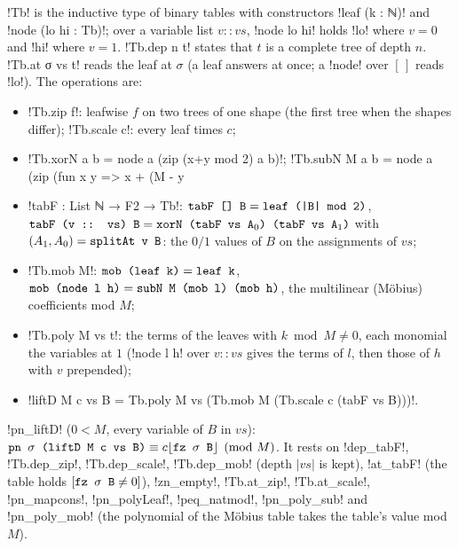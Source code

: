 \begin{definition}\label{def:lean-pathsum-liftd}
\lean!Tb! is the inductive type of binary tables with constructors \lean!leaf (k : ℕ)! and
\lean!node (lo hi : Tb)!; over a variable list $v::vs$, \lean!node lo hi! holds \lean!lo! where
$v=0$ and \lean!hi! where $v=1$. \lean!Tb.dep n t! states that $t$ is a complete tree of depth $n$.
\lean!Tb.at σ vs t! reads the leaf at $\sigma$ (a leaf answers at once; a \lean!node! over $[\,]$
reads \lean!lo!). The operations are:
\begin{itemize}
\item \lean!Tb.zip f!: leafwise $f$ on two trees of one shape (the first tree when the shapes
  differ); \lean!Tb.scale c!: every leaf times $c$;
\item \lean!Tb.xorN a b = node a (zip (x+y mod 2) a b)!; \lean!Tb.subN M a b = node a (zip (fun x y => x + (M - y %
\item \lean!tabF : List ℕ → F2 → Tb!: $\textnormal{\texttt{tabF [] B}}=\textnormal{\texttt{leaf (|B| mod 2)}}$,
  $\textnormal{\texttt{tabF (v :: vs) B}} = \textnormal{\texttt{xorN (tabF vs A}}_0\textnormal{\texttt{) (tabF vs A}}_1\textnormal{\texttt{)}}$ with
  $(A_1,A_0)=\textnormal{\texttt{splitAt v B}}$: the $0/1$ values of $B$ on the assignments of $vs$;
\item \lean!Tb.mob M!: $\textnormal{\texttt{mob (leaf k)}}=\textnormal{\texttt{leaf k}}$,
  $\textnormal{\texttt{mob (node l h)}}=\textnormal{\texttt{subN M (mob l) (mob h)}}$, the multilinear (M\"obius)
  coefficients mod $M$;
\item \lean!Tb.poly M vs t!: the terms of the leaves with $k\bmod M\ne0$, each monomial the
  variables at $1$ (\lean!node l h! over $v::vs$ gives the terms of $l$, then those of $h$ with $v$
  prepended);
\item \lean!liftD M c vs B = Tb.poly M vs (Tb.mob M (Tb.scale c (tabF vs B)))!.
\end{itemize}
\lean!pn_liftD! ($0<M$, every variable of $B$ in $vs$):
$\textnormal{\texttt{pn \ensuremath{\sigma} (liftD M c vs B)}}\equiv c\lfloor\textnormal{\texttt{fz \ensuremath{\sigma} B}}\rfloor\pmod M$.
It rests on \lean!dep_tabF!, \lean!Tb.dep_zip!, \lean!Tb.dep_scale!, \lean!Tb.dep_mob! (depth
$|vs|$ is kept), \lean!at_tabF! (the table holds $[\textnormal{\texttt{fz \ensuremath{\sigma} B}}\ne0]$), \lean!zn_empty!,
\lean!Tb.at_zip!, \lean!Tb.at_scale!, \lean!pn_mapcons!, \lean!pn_polyLeaf!, \lean!peq_natmod!,
\lean!pn_poly_sub! and \lean!pn_poly_mob! (the polynomial of the M\"obius table takes the table's
value mod $M$).
\end{definition}

